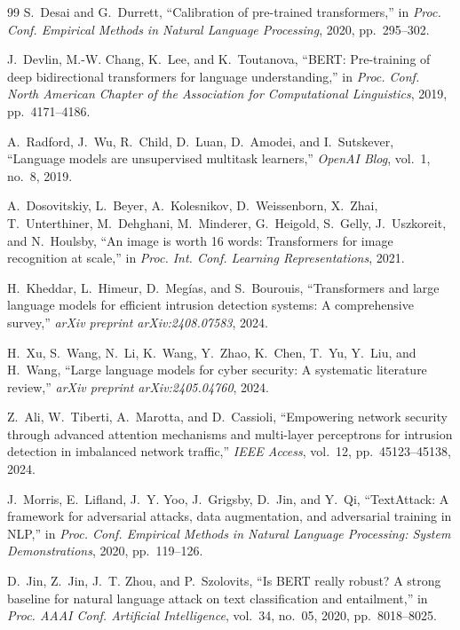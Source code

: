 \documentclass[12pt,a4paper]{article}
\theoremstyle{definition}
\begin{document}
\begin{thebibliography}{99}
S.~Desai and G.~Durrett, ``Calibration of pre-trained transformers,'' in \emph{Proc. Conf. Empirical Methods in Natural Language Processing}, 2020, pp.~295--302.

J.~Devlin, M.-W. Chang, K.~Lee, and K.~Toutanova, ``BERT: Pre-training of deep bidirectional transformers for language understanding,'' in \emph{Proc. Conf. North American Chapter of the Association for Computational Linguistics}, 2019, pp.~4171--4186.

A.~Radford, J.~Wu, R.~Child, D.~Luan, D.~Amodei, and I.~Sutskever, ``Language models are unsupervised multitask learners,'' \emph{OpenAI Blog}, vol.~1, no.~8, 2019.

A.~Dosovitskiy, L.~Beyer, A.~Kolesnikov, D.~Weissenborn, X.~Zhai, T.~Unterthiner, M.~Dehghani, M.~Minderer, G.~Heigold, S.~Gelly, J.~Uszkoreit, and N.~Houlsby, ``An image is worth 16 words: Transformers for image recognition at scale,'' in \emph{Proc. Int. Conf. Learning Representations}, 2021.

H.~Kheddar, L.~Himeur, D.~Meg\'ias, and S.~Bourouis, ``Transformers and large language models for efficient intrusion detection systems: A comprehensive survey,'' \emph{arXiv preprint arXiv:2408.07583}, 2024.

H.~Xu, S.~Wang, N.~Li, K.~Wang, Y.~Zhao, K.~Chen, T.~Yu, Y.~Liu, and H.~Wang, ``Large language models for cyber security: A systematic literature review,'' \emph{arXiv preprint arXiv:2405.04760}, 2024.

Z.~Ali, W.~Tiberti, A.~Marotta, and D.~Cassioli, ``Empowering network security through advanced attention mechanisms and multi-layer perceptrons for intrusion detection in imbalanced network traffic,'' \emph{IEEE Access}, vol.~12, pp.~45123--45138, 2024.

J.~Morris, E.~Lifland, J.~Y. Yoo, J.~Grigsby, D.~Jin, and Y.~Qi, ``TextAttack: A framework for adversarial attacks, data augmentation, and adversarial training in NLP,'' in \emph{Proc. Conf. Empirical Methods in Natural Language Processing: System Demonstrations}, 2020, pp.~119--126.

D.~Jin, Z.~Jin, J.~T. Zhou, and P.~Szolovits, ``Is BERT really robust? A strong baseline for natural language attack on text classification and entailment,'' in \emph{Proc. AAAI Conf. Artificial Intelligence}, vol.~34, no.~05, 2020, pp.~8018--8025.


\end{thebibliography}
\end{document}
